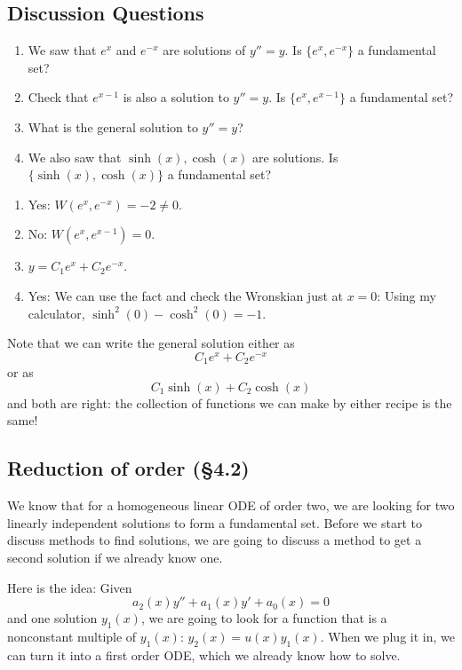 \documentclass[12pt]{amsart}
\numberwithin{equation}{section}
\theoremstyle{plain} %
\theoremstyle{definition}
\theoremstyle{remark}
\begin{document}
\subsection*{Discussion Questions}
\begin{enumerate}
\item
We saw that $e^x$ and $e^{-x}$ are solutions of $y'' = y$.
Is $\{e^x,e^{-x}\}$ a fundamental set? 
\item Check that $e^{x-1}$ is also a solution to $y'' = y$.
Is $\{e^x,e^{x-1}\}$ a fundamental set? 
\item What is the general solution to $y'' = y$?
\item We also saw that $\sinh(x),\cosh(x)$ are solutions.
Is $\{\sinh(x),\cosh(x)\}$ a fundamental set? 
\end{enumerate}
\begin{framed}
\begin{enumerate}
\item
Yes: $W(e^x,e^{-x}) = -2 \neq 0$.
\item No: $W(e^x,e^{x-1}) = 0$.
\item $y = C_1 e^x + C_2 e^{-x}$.
\item Yes: We can use the fact and check the Wronskian just at $x=0$: Using my calculator,
$\sinh^2(0) - \cosh^2(0) = -1$.
\end{enumerate}
Note that we can write the general solution either as 
\[ C_1 e^x + C_2 e^{-x}\]
or as 
\[ C_1 \sinh(x) + C_2 \cosh(x)\]
and both are right: the collection of functions we can make by either recipe is the same!
\end{framed}


\subsection*{Reduction of order (\S4.2)}

We know that for a homogeneous linear ODE of order two, we are looking for two linearly independent solutions to form a fundamental set. Before we start to discuss methods to find solutions, we are going to discuss a method to get a second solution if we already know one. 

Here is the idea:  Given \[ a_2(x) y'' + a_1(x) y' + a_0(x) = 0\] and one solution $y_1(x)$, we are going to look for a function that is a nonconstant multiple of $y_1(x)$:  $y_2(x) = u(x) y_1(x)$. When we plug it in, we can turn it into a first order ODE, which we already know how to solve.
\end{document}
